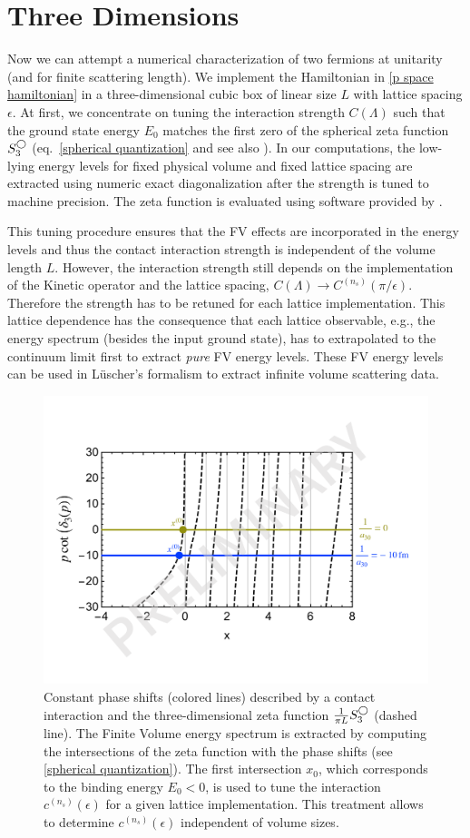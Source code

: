 \section{Three Dimensions}\label{sec:3D}


Now we can attempt a numerical characterization of two fermions at unitarity (and for finite scattering length).
We implement the Hamiltonian in \eqref{p space hamiltonian} in a three-dimensional cubic box of linear size $L$ with lattice spacing $\epsilon$.
At first, we concentrate on tuning the interaction strength $C(\Lambda)$ such that the ground state energy $E_0$ matches the first zero of the spherical zeta function $S^{\bigcirc}_3$ (eq.~\eqref{spherical quantization} and see also ).
In our computations, the low-lying energy levels for fixed physical volume and fixed lattice spacing are extracted using numeric exact diagonalization after the strength is tuned to machine precision.
The zeta function is evaluated using software provided by .

This tuning procedure ensures that the FV effects are incorporated in the energy levels and thus the contact interaction strength is independent of the volume length $L$.
However, the interaction strength still depends on the implementation of the Kinetic operator and the lattice spacing, $C(\Lambda)\to C^{(n_s)}(\pi/\epsilon)$.
Therefore the strength has to be retuned for each lattice implementation.
This lattice dependence has the consequence that each lattice observable, e.g., the energy spectrum (besides the input ground state), has to extrapolated to the continuum limit first to extract \textit{pure} FV energy levels.
These FV energy levels can be used in Lüscher's formalism to extract infinite volume scattering data.

\begin{figure}
\center
\includegraphics[width=.7\textwidth]{figure/tuning.pdf}
\caption{\label{fig:tuning}
    Constant phase shifts (colored lines) described by a contact interaction and the three-dimensional zeta function $\frac{1}{\pi L} S^{\bigcirc}_3$ (dashed line).
    The Finite Volume energy spectrum is extracted by computing the intersections of the zeta function with the phase shifts (see \eqref{spherical quantization}).
    The first intersection $x_0$, which corresponds to the binding energy $E_0 < 0$, is used to tune the interaction $c^{(n_s)}(\epsilon)$ for a given lattice implementation.
    This treatment allows to determine $c^{(n_s)}(\epsilon)$ independent of volume sizes.
}
\end{figure}

